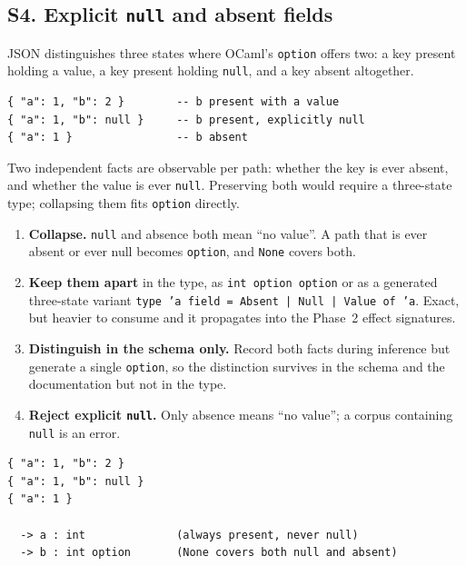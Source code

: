 \subsection*{S4. Explicit \texttt{null} and absent fields}

JSON distinguishes three states where OCaml's \texttt{option} offers two: a
key present holding a value, a key present holding \texttt{null}, and a key
absent altogether.

\begin{lstlisting}[style=json]
{ "a": 1, "b": 2 }        -- b present with a value
{ "a": 1, "b": null }     -- b present, explicitly null
{ "a": 1 }                -- b absent
\end{lstlisting}

Two independent facts are observable per path: whether the key is ever absent,
and whether the value is ever \texttt{null}. Preserving both would require a
three-state type; collapsing them fits \texttt{option} directly.

\options
\begin{enumerate}[label=\textbf{(\alph*)}]
  \item \textbf{Collapse.} \texttt{null} and absence both mean ``no value''.
        A path that is ever absent or ever null becomes \texttt{option}, and
        \texttt{None} covers both. \selected
  \item \textbf{Keep them apart} in the type, as \texttt{int option option} or
        as a generated three-state variant
        \texttt{type 'a field = Absent | Null | Value of 'a}. Exact, but
        heavier to consume and it propagates into the Phase~2 effect
        signatures.
  \item \textbf{Distinguish in the schema only.} Record both facts during
        inference but generate a single \texttt{option}, so the distinction
        survives in the schema and the documentation but not in the type.
  \item \textbf{Reject explicit \texttt{null}.} Only absence means ``no
        value''; a corpus containing \texttt{null} is an error.
\end{enumerate}


\begin{lstlisting}[style=json]
{ "a": 1, "b": 2 }
{ "a": 1, "b": null }
{ "a": 1 }

  -> a : int              (always present, never null)
  -> b : int option       (None covers both null and absent)
\end{lstlisting}

